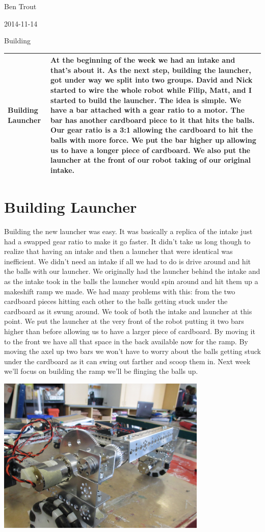 Ben Trout

2014-11-14

Building

\begin{tabular}{|p{5cm}|p{5cm}|}
\hline
Building Launcher&
At the beginning of the week we had an intake and that’s about it. As the next step, building the launcher, got under way we split into two groups. David and Nick started to wire the whole robot while Filip, Matt, and I started to build the launcher. The idea is simple. We have a bar attached with a gear ratio to a motor. The bar has another cardboard piece to it that hits the balls. Our gear ratio is a 3:1 allowing the cardboard to hit the balls with more force. We put the bar higher up allowing us to have a longer piece of cardboard. We also put the launcher at the front of our robot taking of our original intake. 
\\
\hline
\end{tabular}

\section*{Building Launcher}
Building the new launcher was easy. It was basically a replica of the intake just had a swapped gear ratio to make it go faster. It didn’t take us long though to realize that having an intake and then a launcher that were identical was inefficient. We didn’t need an intake if all we had to do is drive around and hit the balls with our launcher. We originally had the launcher behind the intake and as the intake took in the balls the launcher would spin around and hit them up a makeshift ramp we made. We had many problems with this: from the two cardboard pieces hitting each other to the balls getting stuck under the cardboard as it swung around. We took of both the intake and launcher at this point. We put the launcher at the very front of the robot putting it two bars higher than before allowing us to have a larger piece of cardboard. By moving it to the front we have all that space in the back available now for the ramp. By moving the axel up two bars we won’t have to worry about the balls getting stuck under the cardboard as it can swing out farther and scoop them in. Next week we’ll focus on building the ramp we’ll be flinging the balls up. 

\begin{center}
\includegraphics[width=10cm]{./Entries/Images/LauncherInFront.jpg}
\end{center}

